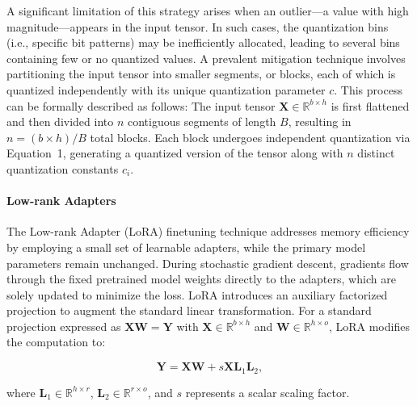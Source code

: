 A significant limitation of this strategy arises when an outlier—a value with high magnitude—appears in the input tensor. In such cases, the quantization bins (i.e., specific bit patterns) may be inefficiently allocated, leading to several bins containing few or no quantized values. A prevalent mitigation technique involves partitioning the input tensor into smaller segments, or blocks, each of which is quantized independently with its unique quantization parameter $c$. This process can be formally described as follows: The input tensor $\mathbf{X}\in \mathbb{R}^{b\times h}$ is first flattened and then divided into $n$ contiguous segments of length $B$, resulting in ${n = ({b\times h} )/{B} }$ total blocks. Each block undergoes independent quantization via Equation~1, generating a quantized version of the tensor along with $n$ distinct quantization constants $c_i$.

\paragraph{Low-rank Adapters} The Low-rank Adapter (LoRA) finetuning technique \citep{hu2021lora} addresses memory efficiency by employing a small set of learnable adapters, while the primary model parameters remain unchanged. During stochastic gradient descent, gradients flow through the fixed pretrained model weights directly to the adapters, which are solely updated to minimize the loss. LoRA introduces an auxiliary factorized projection to augment the standard linear transformation. For a standard projection expressed as ${\mathbf{X} \mathbf{W} = \mathbf{Y}}$ with $\mathbf{X}\in  \mathbb{R}^{b\times h}$ and $\mathbf{W}\in  \mathbb{R}^{h\times o}$, LoRA modifies the computation to:

\begin{equation}
    \mathbf{Y} = \mathbf{X}\mathbf{W} + s\mathbf{X}\mathbf{L}_1\mathbf{L}_2,
\end{equation}

where $\mathbf{L}_1\in  \mathbb{R}^{h\times r}$, $\mathbf{L}_2\in  \mathbb{R}^{r\times o}$, and $s$ represents a scalar scaling factor.

